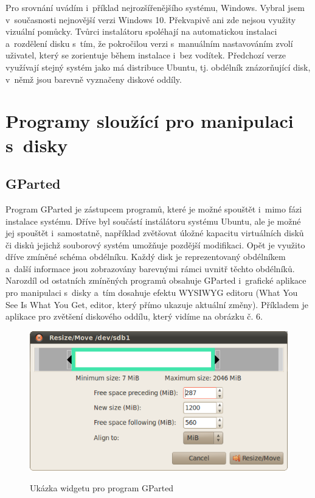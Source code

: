 \documentclass[a4paper]{article}
\begin{document}
Pro srovnání uvádím i~příklad nejrozšířenějšího systému, Windows. Vybral jsem v~současnosti nejnovější verzi Windows 10. Překvapivě ani zde nejsou využity vizuální pomůcky.
Tvůrci instalátoru spoléhají na automatickou instalaci a~rozdělení disku s~tím, že pokročilou verzi s~manuálním nastavováním zvolí uživatel, který se zorientuje během instalace i~bez vodítek. Předchozí 
verze využívají stejný systém jako má distribuce Ubuntu, tj. obdélník znázorňující disk, v~němž jsou barevně vyznačeny diskové oddíly.

\section{Programy sloužící pro manipulaci s~disky}

\subsection{GParted}

Program GParted je zástupcem programů, které je možné spouštět i~mimo fázi instalace systému. Dříve byl součástí instálátoru systému Ubuntu, ale je možné jej spouštět i~samostatně, například 
 zvětšovat úložné kapacitu virtuálních disků či disků jejichž souborový systém umožňuje pozdější modifikaci. Opět je využito dříve zmíněné schéma obdélníku. Každý disk je reprezentovaný 
obdélníkem a~další informace jsou zobrazovány barevnými rámci uvnitř těchto obdélníků. Narozdíl od ostatních zmíněných programů obsahuje GParted i~grafické aplikace pro manipulaci s~disky 
a~tím dosahuje efektu WYSIWYG editoru (What You See Is What You Get, editor, který přímo ukazuje aktuální změny). Příkladem je aplikace pro zvětšení diskového oddílu, který vidíme na obrázku č. 6.

\begin{figure}[hb]
\label{fig:gparted}
\caption{Ukázka widgetu pro program GParted~\cite{GParted}}
\centering
\includegraphics[width=.8\columnwidth]{pics/gparted-5-big.png}\\
\end{figure}
\end{document}
